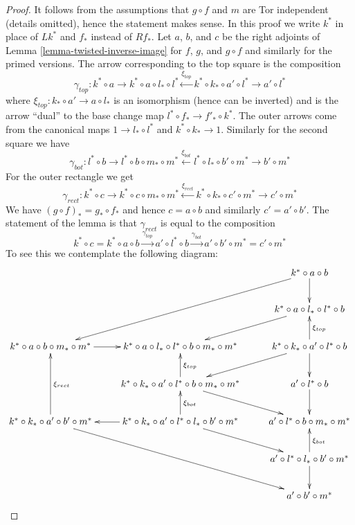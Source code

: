 \documentclass[10pt,a4paper]{amsart}
\theoremstyle{plain}
\theoremstyle{definition}
\theoremstyle{remark}
\numberwithin{equation}{subsection}
\begin{document}
\begin{proof}
It follows from the assumptions that $g \circ f$ and $m$ are Tor
independent (details omitted), hence the statement makes sense.
In this proof we write $k^*$ in place of $Lk^*$ and $f_*$ instead
of $Rf_*$. Let $a$, $b$, and $c$ be the right adjoints of
Lemma \ref{lemma-twisted-inverse-image}
for $f$, $g$, and $g \circ f$ and similarly for the primed versions.
The arrow corresponding to the top square is the composition
$$
\gamma_{top} :
k^* \circ a \to k^* \circ a \circ l_* \circ l^*
\xleftarrow{\xi_{top}} k^* \circ k_* \circ a' \circ l^* \to a' \circ l^*
$$
where $\xi_{top} : k_* \circ a' \to a \circ l_*$
is an isomorphism (hence can be inverted)
and is the arrow ``dual'' to the base change map
$l^* \circ f_* \to f'_* \circ k^*$. The outer arrows come
from the canonical maps $1 \to l_* \circ l^*$ and $k^* \circ k_* \to 1$.
Similarly for the second square we have
$$
\gamma_{bot} :
l^* \circ b \to l^* \circ b \circ m_* \circ m^*
\xleftarrow{\xi_{bot}} l^* \circ l_* \circ b' \circ m^* \to b' \circ m^*
$$
For the outer rectangle we get
$$
\gamma_{rect} :
k^* \circ c \to k^* \circ c \circ m_* \circ m^*
\xleftarrow{\xi_{rect}} k^* \circ k_* \circ c' \circ m^* \to c' \circ m^*
$$
We have $(g \circ f)_* = g_* \circ f_*$ and hence
$c = a \circ b$ and similarly $c' = a' \circ b'$.
The statement of the lemma is that $\gamma_{rect}$
is equal to the composition
$$
k^* \circ c = k^* \circ a \circ b \xrightarrow{\gamma_{top}}
a' \circ l^* \circ b \xrightarrow{\gamma_{bot}}
a' \circ b' \circ m^* = c' \circ m^*
$$
To see this we contemplate the following diagram:
$$
\xymatrix{
& & k^* \circ a \circ b \ar[d] \ar[lldd] \\
& & k^* \circ a \circ l_* \circ l^* \circ b \ar[ld] \\
k^* \circ a \circ b \circ m_* \circ m^* \ar[r] &
k^* \circ a \circ l_* \circ l^* \circ b \circ m_* \circ m^* &
k^* \circ k_* \circ a' \circ l^* \circ b \ar[u]_{\xi_{top}} \ar[d] \ar[ld] \\
& k^*\circ k_* \circ a' \circ l^* \circ b \circ m_* \circ m^*
\ar[u]_{\xi_{top}} \ar[rd] &
a' \circ l^* \circ b \ar[d] \\
k^* \circ k_* \circ a' \circ b' \circ m^* \ar[uu]_{\xi_{rect}} \ar[ddrr] &
k^*\circ k_* \circ a' \circ l^* \circ l_* \circ b' \circ m^*
\ar[u]_{\xi_{bot}} \ar[l] \ar[dr] &
a' \circ l^* \circ b \circ m_* \circ m^* \\
& & a' \circ l^* \circ l_* \circ b' \circ m^* \ar[u]_{\xi_{bot}} \ar[d] \\
& & a' \circ b' \circ m^*
}$$
\end{proof}
\end{document}
